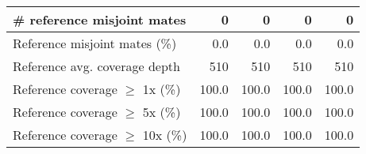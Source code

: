 \documentclass[12pt,a4paper]{article}
\begin{document}
\begin{table}[ht]
\begin{center}
\begin{tabular}{|l*{4}{|r}|}
\# reference misjoint mates & 0 & 0 & 0 & 0 \\ \hline
Reference misjoint mates (\%) & 0.0 & 0.0 & 0.0 & 0.0 \\ \hline
Reference avg. coverage depth & 510 & 510 & 510 & 510 \\ \hline
Reference coverage $\geq$ 1x (\%) & 100.0 & 100.0 & 100.0 & 100.0 \\ \hline
Reference coverage $\geq$ 5x (\%) & 100.0 & 100.0 & 100.0 & 100.0 \\ \hline
Reference coverage $\geq$ 10x (\%) & 100.0 & 100.0 & 100.0 & 100.0 \\ \hline
\end{tabular}
\end{center}
\end{table}
\end{document}
